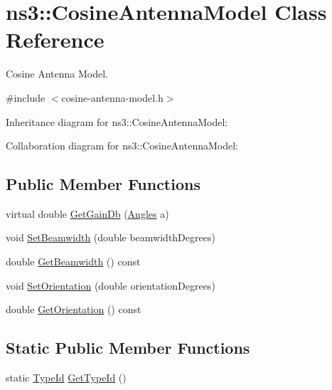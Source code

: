 \hypertarget{classns3_1_1CosineAntennaModel}{}\section{ns3\+:\+:Cosine\+Antenna\+Model Class Reference}
\label{classns3_1_1CosineAntennaModel}


Cosine Antenna Model.  




{\ttfamily \#include $<$cosine-\/antenna-\/model.\+h$>$}



Inheritance diagram for ns3\+:\+:Cosine\+Antenna\+Model\+:


Collaboration diagram for ns3\+:\+:Cosine\+Antenna\+Model\+:
\subsection*{Public Member Functions}
\begin{DoxyCompactItemize}
\item 
virtual double \hyperlink{classns3_1_1CosineAntennaModel_a771c611719f552f261c1a814c1c926d2}{Get\+Gain\+Db} (\hyperlink{structns3_1_1Angles}{Angles} a)
\item 
void \hyperlink{classns3_1_1CosineAntennaModel_a7caccbf17a4aa217250ccf11e73f67a3}{Set\+Beamwidth} (double beamwidth\+Degrees)
\item 
double \hyperlink{classns3_1_1CosineAntennaModel_ae17b3038791a6bbc046fa78860c5cc3a}{Get\+Beamwidth} () const 
\item 
void \hyperlink{classns3_1_1CosineAntennaModel_ae2eb962f9eaa9f507c311f9be43f42d5}{Set\+Orientation} (double orientation\+Degrees)
\item 
double \hyperlink{classns3_1_1CosineAntennaModel_a3c33964b4c3cc55fff79f2d28e4a8591}{Get\+Orientation} () const 
\end{DoxyCompactItemize}
\subsection*{Static Public Member Functions}
\begin{DoxyCompactItemize}
\item 
static \hyperlink{classns3_1_1TypeId}{Type\+Id} \hyperlink{classns3_1_1CosineAntennaModel_a9424e417e8a7e4ac55d1779f4d1d1a2f}{Get\+Type\+Id} ()
\end{DoxyCompactItemize}
